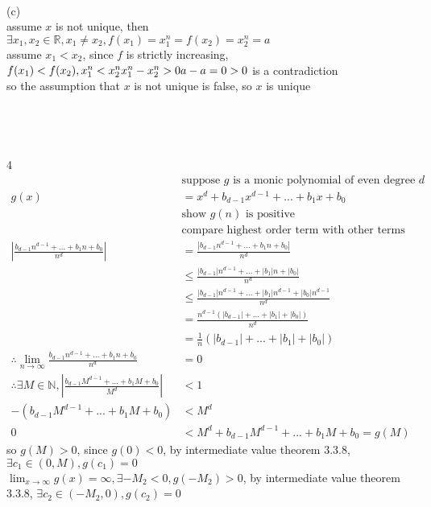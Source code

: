 \documentclass[12pt, border = 4pt, multi]{article} %
\begin{document}
\\
(c)\\
assume $x$ is not unique, then $\exists x_1, x_2 \in \mathbb{R}, x_1 \not= x_2, f(x_1) = x_1 ^ n = f(x_2) = x_2 ^ n = a$\\
assume $x_1 < x_2$, since $f$ is strictly increasing, $f(x_1) < f(x_2), x_1 ^ n < x_2 ^ n\\
x_1 ^ n - x_2 ^ n > 0\\
a - a = 0 > 0$ is a contradiction\\
so the assumption that $x$ is not unique is false, so $x$ is unique\\
\\
\\
\\
\\
4
\begin{align*}
&\text{suppose } g \text{ is a monic polynomial of even degree } d\\
g(x) &= x ^ d + b_{d - 1} x ^ {d - 1} + ... + b_1 x + b_0\\
&\text{show } g(n) \text{ is positive}\\
&\text{compare highest order term with other terms}\\
\left|\frac{b_{d - 1} n ^ {d - 1} + ... + b_1 n + b_0}{n ^ d}\right|
&= \frac{|b_{d - 1} n ^ {d - 1} + ... + b_1 n + b_0|}{n ^ d}\\
&\leq \frac{|b_{d - 1}| n ^ {d - 1} + ... + |b_1| n + |b_0|}{n ^ d}\\
&\leq \frac{|b_{d - 1}| n ^ {d - 1} + ... + |b_1| n ^ {d - 1} + |b_0| n ^ {d - 1}}{n ^ d}\\
&= \frac{n ^ {d - 1}(|b_{d - 1}| + ... + |b_1| + |b_0|)}{n ^ d}\\
&= \frac{1}{n}(|b_{d - 1}| + ... + |b_1| + |b_0|)\\
\therefore \lim_{n \rightarrow \infty}\frac{b_{d - 1} n ^ {d - 1} + ... + b_1 n + b_0}{n ^ d} &= 0\\
\therefore \exists M \in \mathbb{N}, \left|\frac{b_{d - 1} M ^ {d - 1} + ... + b_1 M + b_0}{M ^ d}\right| &< 1\\
-(b_{d - 1} M ^ {d - 1} + ... + b_1 M + b_0) &< M ^ d\\
0 &< M ^ d + b_{d - 1} M ^ {d - 1} + ... + b_1 M + b_0 = g(M)
\end{align*}
so $g(M) > 0$, since $g(0) < 0$, by intermediate value theorem 3.3.8, $\exists c_1 \in (0, M), g(c_1) = 0$\\
$\lim_{x \rightarrow \infty} g(x) = \infty, \exists -M_2 < 0, g(-M_2) > 0$, by intermediate value theorem 3.3.8, $\exists c_2 \in (-M_2, 0), g(c_2) = 0$\\
\end{document}
